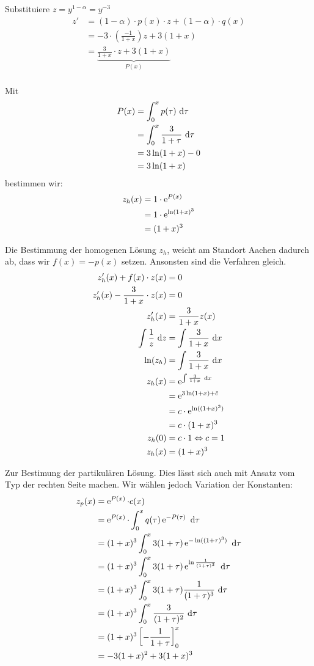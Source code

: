 \documentclass[main.tex]{subfiles}
\begin{document}
Substituiere $z = y^{1-\alpha} = y^{-3}$ 
\begin{align*}
	z' &= (1-\alpha)\cdot p(x) \cdot z + (1-\alpha)\cdot q(x)\\
	   &= -3\cdot \left( \frac{-1}{1+x}\right) z + 3 (1+x)\\
	   &= \underbrace{\frac{3}{1+x}\cdot z + 3 (1+x)}_{P(x)}\\
\end{align*}

Mit
\begin{align*}
	P(x) &= \int^x_0 p(\tau) ~\mathrm{d}\tau\\
	&= \int^x_0 \frac{3}{1+\tau}~\mathrm{d}\tau\\
	&= 3\ln(1+x) - 0 \\
	&= 3\ln(1+x)
\end{align*}
bestimmen wir:
\begin{align*}
	z_h(x) &= 1\cdot \operatorname{\mathrm{e}}^{P(x)} \\
		   &= 1\cdot \operatorname{\mathrm{e}}^{\ln(1+x)^3} \\
		   &= (1+x)^3
\end{align*}

Die Bestimmung der homogenen Lösung $z_h$, weicht am Standort Aachen dadurch ab, dass wir $f(x) = -p(x)$ setzen. Ansonsten sind die Verfahren gleich. 
\begin{align*}
	z_h'(x) + f(x)\cdot z(x) &= 0 \\
	z_h'(x) - \frac{3}{1+x}\cdot z(x) &= 0 \\
	z_h'(x) &= \frac{3}{1+x} z(x) \\
	\int \frac{1}{z}~\mathrm{d}z &= \int \frac{3}{1+x} ~\mathrm{d}x \\
	\ln(z_h) &= \int \frac{3}{1+x} ~\mathrm{d}x\\
	z_h(x) &= \operatorname{\mathrm{e}}^{\int \frac{3}{1+x}~\mathrm{d}x} \\
	  &= \operatorname{\mathrm{e}}^{3\ln(1+x)+\tilde{c}}\\
	  &= c\cdot \operatorname{\mathrm{e}}^{\ln((1+x)^3)}\\
	  &= c\cdot (1+x)^3 \\
	z_h(0) &= c\cdot 1 \Leftrightarrow c = 1 \\
	z_h(x) &= (1+x)^3
\end{align*}

Zur Bestimung der partikulären Lösung. Dies lässt sich auch mit Ansatz vom Typ der rechten Seite machen. Wir wählen jedoch Variation der Konstanten: 
\begin{align*}
	z_p(x) &= \operatorname{\mathrm{e}}^{P(x)} \cdot c(x)\\
		   &= \operatorname{\mathrm{e}}^{P(x)} \cdot \int_0^x q(\tau)\operatorname{\mathrm{e}}^{-P(\tau)} ~\mathrm{d}\tau\\
		   &= (1+x)^3 \int_0^x 3(1+\tau) \operatorname{\mathrm{e}}^{-\ln((1+\tau)^3)} ~\mathrm{d}\tau \\
		   &= (1+x)^3 \int_0^x 3(1+\tau) \operatorname{\mathrm{e}}^{\ln\frac{1}{(1+\tau)^3}} ~\mathrm{d}\tau \\
		   &= (1+x)^3 \int_0^x 3(1+\tau) \frac{1}{(1+\tau)^3} ~\mathrm{d}\tau \\
		   &= (1+x)^3 \int_0^x \frac{3}{(1+\tau)^2} ~\mathrm{d}\tau \\
		   &= (1+x)^3 \left[ - \frac{1}{1+\tau} \right]_0^x \\
		   &= -3(1+x)^2 + 3(1+x)^3 \\
\end{align*}
\end{document}
